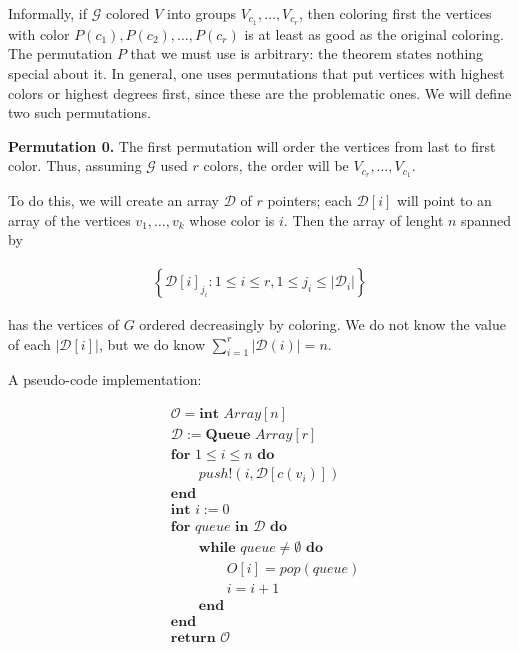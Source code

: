\documentclass[a4paper, 12pt]{article}
\begin{document}
Informally, if $\mathcal{G}$ colored $V$ into groups $V_{c_1}, \ldots,
V_{c_r}$, then coloring first the vertices with color $P(c_1), P(c_2), \ldots,
P(c_r)$ is at least as good as the original coloring. The permutation $P$ that
we must use is arbitrary: the theorem states nothing special about it. In
general, one uses permutations that put vertices with highest colors or highest
degrees first, since these are the problematic ones. We will define two such
permutations.

\textbf{Permutation 0.} The first permutation will order the vertices from last
to first color. Thus, assuming $\mathcal{G}$ used $r$ colors, the order will be
$V_{c_r}, \ldots, V_{c_1}$. 

To do this, we will create an array $\mathcal{D}$ of $r$ pointers;  each
$\mathcal{D}[i]$ will point to an array of the vertices $v_1, \ldots, v_k$
whose color is $i$. Then the array of lenght $n$ spanned by 

\begin{align*}
    \left\{ \mathcal{D}[i]_{j_i} : 1 \leq i \leq r, 1 \leq j_i \leq |\mathcal{D}_i| \right\} 
\end{align*}

has the vertices of $G$ ordered decreasingly by coloring. We do not know the
value of each $|\mathcal{D}[i]|$, but we do know $\sum_{i=1}^{r} |
\mathcal{D}(i) | = n$.

A pseudo-code implementation:

\begin{align*}
    &\mathcal{O} = \textbf{int } Array[n]\\
    &\mathcal{D} := \textbf{Queue } Array[r] \\
    &\textbf{for } 1 \leq i \leq n \textbf{ do} \\ 
    &\qquad push!(i, \mathcal{D}[c(v_i)])\\
    &\textbf{end}\\
    &\textbf{int } i := 0\\
    &\textbf{for } queue \textbf{ in } \mathcal{D} \textbf{ do}\\
    &\qquad\textbf{while } queue \neq \emptyset \textbf{ do}\\
    &\qquad \qquad O[i] = pop(queue) \\ 
    &\qquad \qquad i = i + 1\\
    &\qquad\textbf{end}\\
    &\textbf{end}\\
    &\textbf{return } \mathcal{O}
\end{align*}
\end{document}
